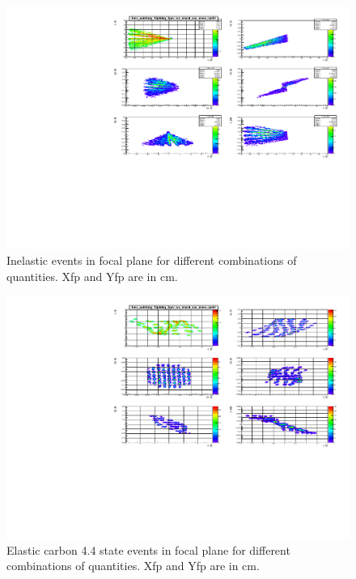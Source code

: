 \documentclass[]{article}
\begin{document}
\begin{figure}	
\begin{center}
	\includegraphics[angle=90]{hms_pointtarg_13p5deg_2gev_wc_mscat_vac_sieve_car44_inelastic.pdf}
\end{center}
\caption{Inelastic events in focal plane for different combinations of quantities. Xfp and Yfp
	are in cm.}
\label{fig:inelastic}
\end{figure}

\begin{figure}	
	\begin{center}
		\includegraphics[angle=90]{hms_pointtarg_13p5deg_2gev_wc_mscat_vac_sieve_car44_44.pdf}
	\end{center}
	\caption{Elastic carbon 4.4 state events in focal plane for different combinations of quantities. Xfp and Yfp
	are in cm.}
	\label{fig:elastic44}
\end{figure}
\end{document}
